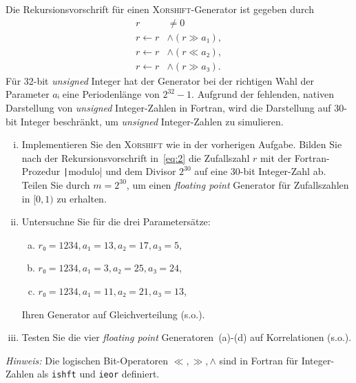 \begin{question}[subtitle=\textsc{Xorshift}-Generatoren]
  Die Rekursionsvorschrift für einen \textsc{Xorshift}-Generator ist gegeben durch
  \begin{equation}
    \label{eq:2}
    \begin{split}
      r & ≠ 0 \\
      r ← r & ∧ (r ≫ a₁), \\
      r ← r & ∧ (r ≪ a₂), \\
      r ← r & ∧ (r ≫ a₃).
    \end{split}
  \end{equation}
  Für \num{32}-bit \textit{unsigned} Integer hat der Generator bei der richtigen Wahl der Parameter $aᵢ$ eine Periodenlänge von $2^{32} - 1$.
  Aufgrund der fehlenden, nativen Darstellung von \textit{unsigned} Integer-Zahlen in Fortran, wird die Darstellung auf \num{30}-bit Integer beschränkt, um \textit{unsigned} Integer-Zahlen zu simulieren.
  \begin{enumerate}[(i)]
  \item Implementieren Sie den \textsc{Xorshift} wie in der vorherigen Aufgabe.
    Bilden Sie nach der Rekursionsvorschrift in~\cref{eq:2} die Zufallszahl $r$ mit der Fortran-Prozedur \texttt|modulo| und dem Divisor $2^{30}$ auf eine 30-bit Integer-Zahl ab.
    Teilen Sie durch $m = 2^{30}$, um einen \textit{floating point} Generator für Zufallszahlen in $[0, 1)$ zu erhalten.
  \item Untersuchne Sie für die drei Parametersätze:
    \begin{enumerate}[(a)]
    \item\label{item:7} $r₀ = 1234, a₁ = 13, a₂ = 17, a₃ = 5$,
    \item\label{item:5} $r₀ = 1234, a₁ = 3, a₂ = 25, a₃ = 24$,
    \item\label{item:6} $r₀ = 1234, a₁ = 11, a₂ = 21, a₃ = 13$,
    \end{enumerate}
    Ihren Generator auf Gleichverteilung (s.o.).
  \item Testen Sie die vier \textit{floating point} Generatoren~(a)-(d) auf Korrelationen (s.o.).
  \end{enumerate}

  \textit{Hinweis:} Die logischen Bit-Operatoren $≪, ≫, ∧$ sind in Fortran für Integer-Zahlen als \texttt{ishft} und \texttt{ieor} definiert.
\end{question}


